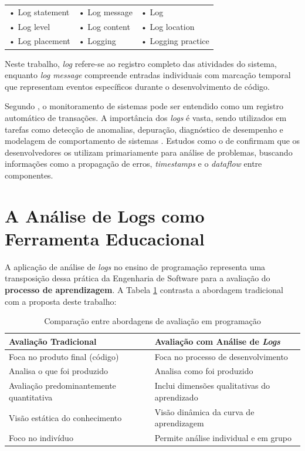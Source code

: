 \begingroup
\renewcommand{\arraystretch}{1.2}
\begin{tabular}{p{}p{}p{}}
    • Log statement       & • Log message     & • Log \\
    • Log level           & • Log content     & • Log location \\
    • Log placement       & • Logging         & • Logging practice \\
\end{tabular}
\endgroup
\vspace{2em}

Neste trabalho, \textit{log} refere-se ao registro completo das atividades do sistema, enquanto \textit{log message} compreende entradas individuais com marcação temporal que representam eventos específicos durante o desenvolvimento de código.

Segundo \cite{rice1983use}, o monitoramento de sistemas pode ser entendido como um registro automático de transações. A importância dos \textit{logs} é vasta, sendo utilizados em tarefas como detecção de anomalias, depuração, diagnóstico de desempenho e modelagem de comportamento de sistemas \cite{fu_where_2014}. Estudos como o de \cite{yang2021interview} confirmam que os desenvolvedores os utilizam primariamente para análise de problemas, buscando informações como a propagação de erros, \textit{timestamps} e o \textit{dataflow} entre componentes.

\section{A Análise de Logs como Ferramenta Educacional}
\label{sec:logs-educacionais}

A aplicação de análise de \textit{logs} no ensino de programação representa uma transposição dessa prática da Engenharia de Software para a avaliação do \textbf{processo de aprendizagem}. A Tabela \ref{tab:comparacao-avaliacao} contrasta a abordagem tradicional com a proposta deste trabalho:

\begin{table}[h]
\centering
\caption{Comparação entre abordagens de avaliação em programação}
\label{tab:comparacao-avaliacao}
\begin{tabular}{p{}p{}}
\hline
\textbf{Avaliação Tradicional} & \textbf{Avaliação com Análise de \textit{Logs}} \\
\hline
Foca no produto final (código) & Foca no processo de desenvolvimento \\
Analisa o que foi produzido & Analisa como foi produzido \\
Avaliação predominantemente quantitativa & Inclui dimensões qualitativas do aprendizado \\
Visão estática do conhecimento & Visão dinâmica da curva de aprendizagem \\
Foco no indivíduo & Permite análise individual e em grupo \\
\hline
\end{tabular}
\end{table}

